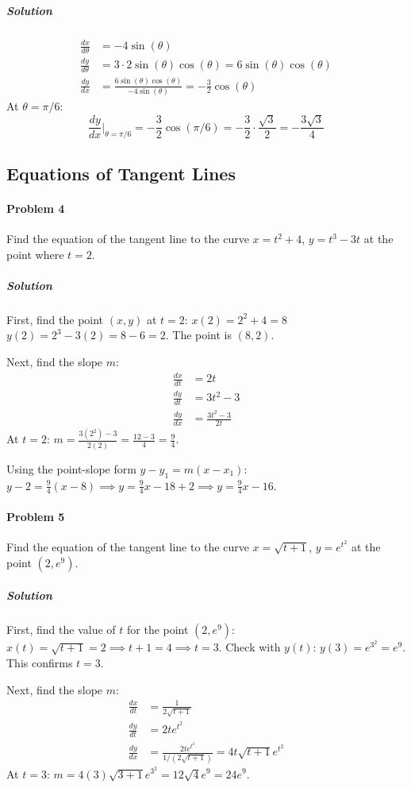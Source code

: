 \documentclass{article}
\begin{document}
\subparagraph{Solution}
\begin{align*}
\frac{dx}{d\theta} &= -4\sin(\theta) \\
\frac{dy}{d\theta} &= 3 \cdot 2\sin(\theta)\cos(\theta) = 6\sin(\theta)\cos(\theta) \\
\frac{dy}{dx} &= \frac{6\sin(\theta)\cos(\theta)}{-4\sin(\theta)} = -\frac{3}{2}\cos(\theta)
\end{align*}
At $\theta = \pi/6$:
\[ \frac{dy}{dx}\bigg|_{\theta=\pi/6} = -\frac{3}{2}\cos(\pi/6) = -\frac{3}{2} \cdot \frac{\sqrt{3}}{2} = -\frac{3\sqrt{3}}{4} \]

\subsection*{Equations of Tangent Lines}

\paragraph{Problem 4}
Find the equation of the tangent line to the curve $x = t^2 + 4$, $y = t^3 - 3t$ at the point where $t=2$.

\subparagraph{Solution}
First, find the point $(x,y)$ at $t=2$:
$x(2) = 2^2 + 4 = 8$
$y(2) = 2^3 - 3(2) = 8 - 6 = 2$. The point is $(8, 2)$.

Next, find the slope $m$:
\begin{align*}
\frac{dx}{dt} &= 2t \\
\frac{dy}{dt} &= 3t^2 - 3 \\
\frac{dy}{dx} &= \frac{3t^2 - 3}{2t}
\end{align*}
At $t=2$: $m = \frac{3(2^2) - 3}{2(2)} = \frac{12-3}{4} = \frac{9}{4}$.

Using the point-slope form $y - y_1 = m(x - x_1)$:
$y - 2 = \frac{9}{4}(x - 8) \implies y = \frac{9}{4}x - 18 + 2 \implies y = \frac{9}{4}x - 16$.

\paragraph{Problem 5}
Find the equation of the tangent line to the curve $x = \sqrt{t+1}$, $y = e^{t^2}$ at the point $(2, e^9)$.

\subparagraph{Solution}
First, find the value of $t$ for the point $(2, e^9)$:
$x(t) = \sqrt{t+1} = 2 \implies t+1 = 4 \implies t=3$.
Check with $y(t)$: $y(3) = e^{3^2} = e^9$. This confirms $t=3$.

Next, find the slope $m$:
\begin{align*}
\frac{dx}{dt} &= \frac{1}{2\sqrt{t+1}} \\
\frac{dy}{dt} &= 2te^{t^2} \\
\frac{dy}{dx} &= \frac{2te^{t^2}}{1/(2\sqrt{t+1})} = 4t\sqrt{t+1}e^{t^2}
\end{align*}
At $t=3$: $m = 4(3)\sqrt{3+1}e^{3^2} = 12\sqrt{4}e^9 = 24e^9$.
\end{document}

